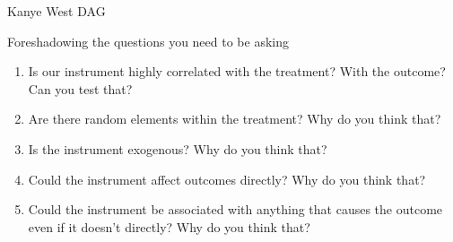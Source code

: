\documentclass{beamer}
\begin{document}
\begin{frame}{Kanye West DAG}


  \begin{center}
    \begin{minipage}{.5\textwidth}

      \begin{center}

      \end{center}
    \end{minipage}


  \end{center}


\end{frame}


\begin{frame}{Foreshadowing the questions you need to be asking}

  \begin{enumerate}
    \item Is our instrument highly correlated with the treatment? With the outcome? Can you test that?
    \item Are there random elements within the treatment? Why do you think that?
    \item Is the instrument exogenous?  Why do you think that?
    \item Could the instrument affect outcomes directly? Why do you think that?
    \item Could the instrument be associated with anything that causes the outcome even if it doesn't directly? Why do you think that?
  \end{enumerate}

\end{frame}
\end{document}
